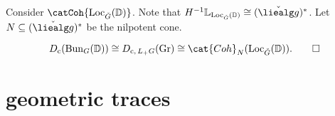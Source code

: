 \documentclass[english, no-theorem-numbers]{short-notes}
\begin{document}
Consider $\catCoh{\Loc_{\ld G}(\mathbb D)}$.
Note that $H^{-1}\mathbb L_{\Loc_{\ld G}(\mathbb D)} \cong (\ld{\liealg g})^*$.
Let $N \subseteq (\ld{\liealg g})^*$ be the nilpotent cone.
\begin{Thm}
    \[
        D_{\mathrm c}(\Bun_G(\mathbb D)) \cong
        D_{\mathrm c,\, L_+G}(\Gr) \cong
        \cat{Coh}_N(\Loc_{\ld G}(\mathbb D)).
        \qedhere
    \]
\end{Thm}
\section{geometric traces}

\printbibliography
\end{document}
